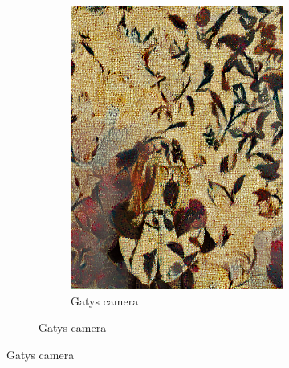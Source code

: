 \begin{figure}[]
\begin{subfigure}{\textwidth}
\begin{subfigure}{0.24\textwidth}
            \includegraphics[width=\textwidth]{images/04-experiment02/human/flowers2/gatys_proj.jpg}
            \caption*{Gatys camera}
        \end{subfigure}
        

\end{subfigure}
\end{figure}
